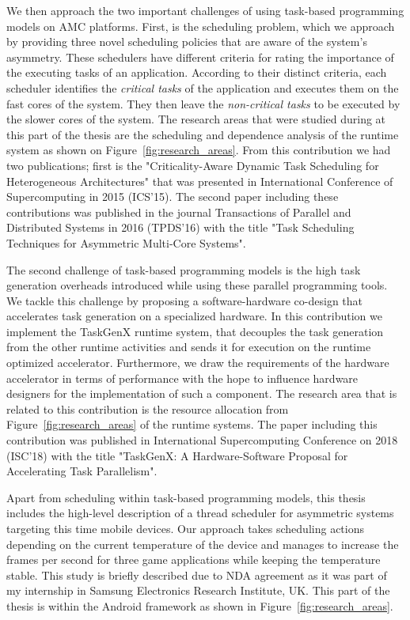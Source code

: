 We then approach the two important challenges of using task-based programming models on AMC platforms.
First, is the scheduling problem, which we approach by providing three novel scheduling policies that are aware of the system's asymmetry.
These schedulers have different criteria for rating the importance of the executing tasks of an application.
According to their distinct criteria, each scheduler identifies the \textit{critical tasks} of the application and executes them on the fast cores of the system. 
They then leave the \textit{non-critical tasks} to be executed by the slower cores of the system.
The research areas that were studied during at this part of the thesis are the scheduling and dependence analysis of the runtime system as shown on Figure~\ref{fig:research_areas}.
From this contribution we had two publications; first is the "Criticality-Aware Dynamic Task Scheduling for Heterogeneous Architectures" that was presented in International Conference of Supercomputing in 2015 (ICS'15).
The second paper including these contributions was published in the journal Transactions of Parallel and Distributed Systems in 2016 (TPDS'16) with the title "Task Scheduling Techniques for Asymmetric Multi-Core Systems".

The second challenge of task-based programming models is the high task generation overheads introduced while using these parallel programming tools.
We tackle this challenge by proposing a software-hardware co-design that accelerates task generation on a specialized hardware.
In this contribution we implement the TaskGenX runtime system, that decouples the task generation from the other runtime activities and sends it for execution on the runtime optimized accelerator.
Furthermore, we draw the requirements of the hardware accelerator in terms of performance with the hope to influence hardware designers for the implementation of such a component.
The research area that is related to this contribution is the resource allocation from Figure~\ref{fig:research_areas} of the runtime systems.
The paper including this contribution was published in International Supercomputing Conference on 2018 (ISC'18) with the title "TaskGenX: A Hardware-Software Proposal for Accelerating Task Parallelism".

Apart from scheduling within task-based programming models, this thesis includes the high-level description of a thread scheduler for asymmetric systems targeting this time mobile devices.
Our approach takes scheduling actions depending on the current temperature of the device and manages to increase the frames per second for three game applications while keeping the temperature stable.
This study is briefly described due to NDA agreement as it was part of my internship in Samsung Electronics Research Institute, UK.
This part of the thesis is within the Android framework as shown in Figure~\ref{fig:research_areas}.


